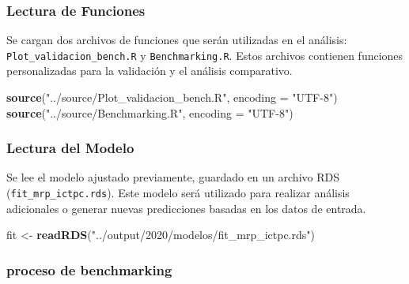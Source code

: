 \documentclass[
  12pt,
]{book}
\newenvironment{Shaded}{\begin{snugshade}}{\end{snugshade}}
\newcommand{\AttributeTok}[1]{\textcolor[rgb]{0.13,0.29,0.53}{#1}}
\newcommand{\FunctionTok}[1]{\textcolor[rgb]{0.13,0.29,0.53}{\textbf{#1}}}
\newcommand{\NormalTok}[1]{#1}
\newcommand{\OtherTok}[1]{\textcolor[rgb]{0.56,0.35,0.01}{#1}}
\newcommand{\StringTok}[1]{\textcolor[rgb]{0.31,0.60,0.02}{#1}}
\begin{document}
\hypertarget{lectura-de-funciones}{%
\subsubsection*{Lectura de Funciones}\label{lectura-de-funciones}}

Se cargan dos archivos de funciones que serán utilizadas en el análisis: \texttt{Plot\_validacion\_bench.R} y \texttt{Benchmarking.R}. Estos archivos contienen funciones personalizadas para la validación y el análisis comparativo.

\begin{Shaded}
\begin{Highlighting}[]
\FunctionTok{source}\NormalTok{(}\StringTok{"../source/Plot\_validacion\_bench.R"}\NormalTok{, }\AttributeTok{encoding =} \StringTok{"UTF{-}8"}\NormalTok{)}
\FunctionTok{source}\NormalTok{(}\StringTok{"../source/Benchmarking.R"}\NormalTok{, }\AttributeTok{encoding =} \StringTok{"UTF{-}8"}\NormalTok{)}
\end{Highlighting}
\end{Shaded}

\hypertarget{lectura-del-modelo}{%
\subsubsection*{Lectura del Modelo}\label{lectura-del-modelo}}

Se lee el modelo ajustado previamente, guardado en un archivo RDS (\texttt{fit\_mrp\_ictpc.rds}). Este modelo será utilizado para realizar análisis adicionales o generar nuevas predicciones basadas en los datos de entrada.

\begin{Shaded}
\begin{Highlighting}[]
\NormalTok{fit }\OtherTok{\textless{}{-}} \FunctionTok{readRDS}\NormalTok{(}\StringTok{"../output/2020/modelos/fit\_mrp\_ictpc.rds"}\NormalTok{)}
\end{Highlighting}
\end{Shaded}

\hypertarget{proceso-de-benchmarking}{%
\subsubsection*{proceso de benchmarking}\label{proceso-de-benchmarking}}
\end{document}
